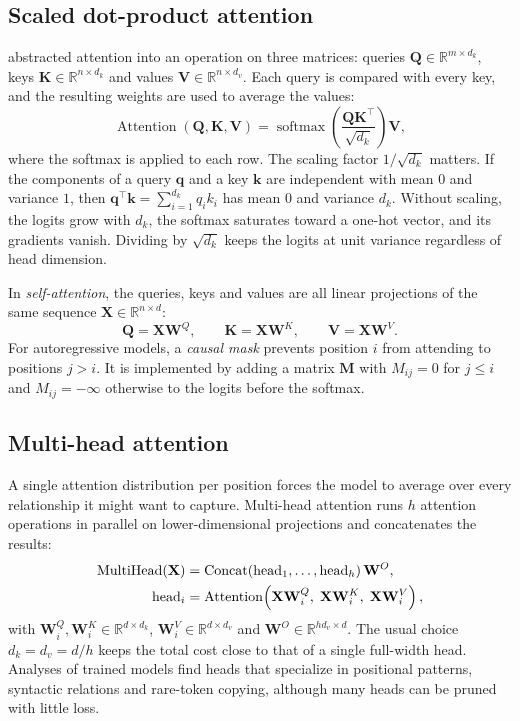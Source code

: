\documentclass[11pt]{article}
\DeclareMathOperator{\softmax}{softmax}
\newcommand{\R}{\mathbb{R}}
\newcommand{\mQ}{\mathbf{Q}}
\newcommand{\mK}{\mathbf{K}}
\newcommand{\mV}{\mathbf{V}}
\newcommand{\mW}{\mathbf{W}}
\newcommand{\mX}{\mathbf{X}}
\begin{document}
\subsection{Scaled dot-product attention}
\label{sec:sdpa}

\citet{vaswani2017attention} abstracted attention into an operation on three matrices: queries $\mQ \in \R^{m \times d_k}$, keys $\mK \in \R^{n \times d_k}$ and values $\mV \in \R^{n \times d_v}$. Each query is compared with every key, and the resulting weights are used to average the values:
\begin{equation}
  \operatorname{Attention}(\mQ, \mK, \mV) = \softmax\!\left( \frac{\mQ\mK^\top}{\sqrt{d_k}} \right) \mV,
  \label{eq:sdpa}
\end{equation}
where the softmax is applied to each row. The scaling factor $1/\sqrt{d_k}$ matters. If the components of a query $\bm{q}$ and a key $\bm{k}$ are independent with mean $0$ and variance $1$, then $\bm{q}^\top\bm{k} = \sum_{i=1}^{d_k} q_i k_i$ has mean $0$ and variance $d_k$. Without scaling, the logits grow with $d_k$, the softmax saturates toward a one-hot vector, and its gradients vanish. Dividing by $\sqrt{d_k}$ keeps the logits at unit variance regardless of head dimension.

In \emph{self-attention}, the queries, keys and values are all linear projections of the same sequence $\mX \in \R^{n \times d}$:
\begin{equation}
  \mQ = \mX\mW^Q, \qquad \mK = \mX\mW^K, \qquad \mV = \mX\mW^V.
\end{equation}
For autoregressive models, a \emph{causal mask} prevents position $i$ from attending to positions $j > i$. It is implemented by adding a matrix $\mathbf{M}$ with $M_{ij} = 0$ for $j \le i$ and $M_{ij} = -\infty$ otherwise to the logits before the softmax.

\subsection{Multi-head attention}
\label{sec:mha}

A single attention distribution per position forces the model to average over every relationship it might want to capture. Multi-head attention runs $h$ attention operations in parallel on lower-dimensional projections and concatenates the results:
\begin{align}
  \operatorname{MultiHead}(\mX) &= \operatorname{Concat}(\mathrm{head}_1, \dots, \mathrm{head}_h)\, \mW^O, \label{eq:mha} \\
  \mathrm{head}_i &= \operatorname{Attention}\!\left( \mX\mW_i^Q,\; \mX\mW_i^K,\; \mX\mW_i^V \right), \notag
\end{align}
with $\mW_i^Q, \mW_i^K \in \R^{d \times d_k}$, $\mW_i^V \in \R^{d \times d_v}$ and $\mW^O \in \R^{h d_v \times d}$. The usual choice $d_k = d_v = d/h$ keeps the total cost close to that of a single full-width head. Analyses of trained models find heads that specialize in positional patterns, syntactic relations and rare-token copying, although many heads can be pruned with little loss.
\end{document}
